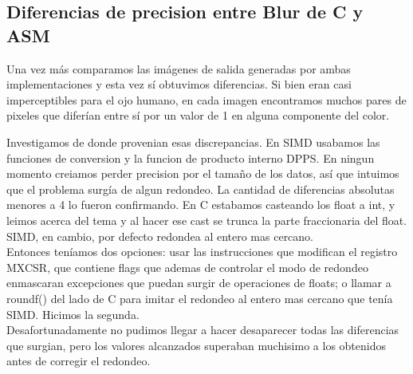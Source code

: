 \documentclass[10pt,a4paper,spanish]{article}
\begin{document}
\begin{center}
\end{center}

\subsection{Diferencias de precision entre Blur de C y ASM}

Una vez más comparamos las imágenes de salida generadas por ambas implementaciones y esta vez sí obtuvimos diferencias. Si bien eran casi imperceptibles para el ojo humano, en cada imagen encontramos muchos pares de pixeles que diferían entre sí por un valor de 1 en alguna componente del color.

Investigamos de donde provenian esas discrepancias. En SIMD usabamos las funciones de conversion y la funcion de producto interno DPPS. En ningun momento creiamos perder precision por el tamaño de los datos, así que intuimos que el problema surgía de algun redondeo. La cantidad de diferencias absolutas menores a 4 lo fueron confirmando. En C estabamos casteando los float a int, y leimos acerca del tema y al hacer ese cast se trunca la parte fraccionaria del float. SIMD, en cambio, por defecto redondea al entero mas cercano.\\

Entonces teníamos dos opciones: usar las instrucciones que modifican el registro MXCSR, que contiene flags que ademas de controlar el modo de redondeo enmascaran excepciones que puedan surgir de operaciones de floats; o llamar a roundf() del lado de C para imitar el redondeo al entero mas cercano que tenía SIMD. Hicimos la segunda. \\

Desafortunadamente no pudimos llegar a hacer desaparecer todas las diferencias que surgian, pero los valores alcanzados superaban muchisimo a los obtenidos antes de corregir el redondeo. \\
\end{document}
